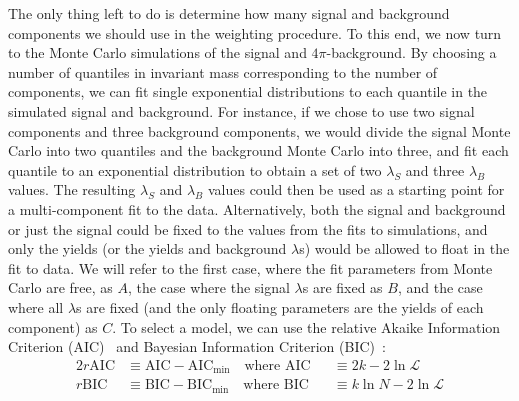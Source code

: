 The only thing left to do is determine how many signal and background components we should use in the weighting procedure. To this end, we now turn to the Monte Carlo simulations of the signal and $4\pi$-background. By choosing a number of quantiles in invariant mass corresponding to the number of components, we can fit single exponential distributions to each quantile in the simulated signal and background. For instance, if we chose to use two signal components and three background components, we would divide the signal Monte Carlo into two quantiles and the background Monte Carlo into three, and fit each quantile to an exponential distribution to obtain a set of two $\lambda_S$ and three $\lambda_B$ values. The resulting $\lambda_S$ and $\lambda_B$ values could then be used as a starting point for a multi-component fit to the data. Alternatively, both the signal and background or just the signal could be fixed to the values from the fits to simulations, and only the yields (or the yields and background $\lambda$s) would be allowed to float in the fit to data. We will refer to the first case, where the fit parameters from Monte Carlo are free, as $A$, the case where the signal $\lambda$s are fixed as $B$, and the case where all $\lambda$s are fixed (and the only floating parameters are the yields of each component) as $C$. To select a model, we can use the relative Akaike Information Criterion (AIC)~\cite{akaike_information_1998} and Bayesian Information Criterion (BIC)~\cite{schwarz_estimating_1978}:
\begin{alignat}{2}
  r\text{AIC} &\equiv \text{AIC} - \text{AIC}_\text{min} \quad\text{where } \text{AIC} &&\equiv 2k - 2\ln\mathcal{L} \\
  r\text{BIC} &\equiv \text{BIC} - \text{BIC}_\text{min} \quad\text{where } \text{BIC} &&\equiv k\ln{N} - 2\ln\mathcal{L} \\
  \label{eq:information-criteria}
\end{alignat}
